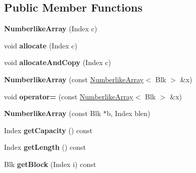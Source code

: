 \subsection*{Public Member Functions}
\begin{DoxyCompactItemize}
\item 
\mbox{\label{class_numberlike_array_a787b3f19ed994ee9dc87613a052a51ca}} 
{\bfseries Numberlike\+Array} (Index c)
\item 
\mbox{\label{class_numberlike_array_af679905e09b95d7b0ae4174d473b25f8}} 
void {\bfseries allocate} (Index c)
\item 
\mbox{\label{class_numberlike_array_af33c23327f2abe6850264180b3147055}} 
void {\bfseries allocate\+And\+Copy} (Index c)
\item 
\mbox{\label{class_numberlike_array_aec3cb7d201b1db27d41b7722530e7b54}} 
{\bfseries Numberlike\+Array} (const \mbox{\hyperlink{class_numberlike_array}{Numberlike\+Array}}$<$ Blk $>$ \&x)
\item 
\mbox{\label{class_numberlike_array_a0c68894dfe11e7786b4768c7258bf4c6}} 
void {\bfseries operator=} (const \mbox{\hyperlink{class_numberlike_array}{Numberlike\+Array}}$<$ Blk $>$ \&x)
\item 
\mbox{\label{class_numberlike_array_acd313b6f0036aada1dc5ef596101e934}} 
{\bfseries Numberlike\+Array} (const Blk $\ast$b, Index blen)
\item 
\mbox{\label{class_numberlike_array_ab4bf2e96e006c9237d3233e1f2f30add}} 
Index {\bfseries get\+Capacity} () const
\item 
\mbox{\label{class_numberlike_array_a14eef564b220025975d95da51c3c33d7}} 
Index {\bfseries get\+Length} () const
\item 
\mbox{\label{class_numberlike_array_a1eb37624f06f01b9fa1d794a71b0fa03}} 
Blk {\bfseries get\+Block} (Index i) const
\item 
\mbox{\label{class_numberlike_array_a10acd5b5c4c571a531019db373b6ffbf}} 

\end{DoxyCompactItemize}
